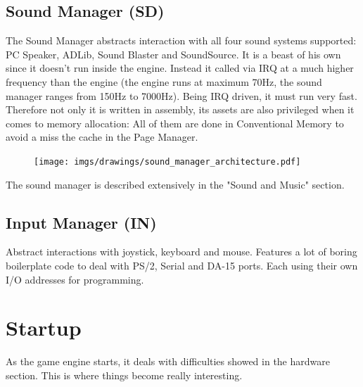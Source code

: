 \documentclass[book.tex]{subfiles}
\begin{document}
\subsection{Sound Manager (SD)}
The Sound Manager abstracts interaction with all four sound systems supported: PC Speaker, ADLib, Sound Blaster and SoundSource. It is a beast of his own since it doesn't run inside the engine. Instead it called via IRQ at a much higher frequency than the engine (the engine runs at maximum 70Hz, the sound manager ranges from 150Hz to 7000Hz). Being IRQ driven, it must run very fast. Therefore not only it is written in assembly, its assets are also privileged when it comes to memory allocation: All of them are done in Conventional Memory to avoid a miss the cache in the Page Manager.\\
 \par
\begin{figure}[H]
\centering
 \texttt{[image: imgs/drawings/sound\_manager\_architecture.pdf]}
 \end{figure}
 \par
The sound manager is described extensively in the "Sound and Music" section.

















\subsection{Input Manager (IN)}
Abstract interactions with joystick, keyboard and mouse. Features a lot of boring boilerplate code to deal with PS/2, Serial and DA-15 ports. Each using their own I/O addresses for programming.
















\section{Startup}
As the game engine starts, it deals with difficulties showed in the hardware section. This is where things become really interesting.
\end{document}
